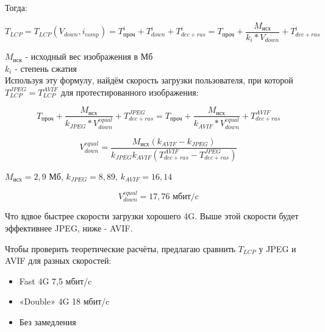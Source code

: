 \documentclass[12pt]{article}
\begin{document}
Тогда:

\[
    T_{LCP} = T_{LCP}(V_{down}, i_{comp}) = T^{i}_{\text{проч}} + T^{i}_{down} + T^{i}_{dec+ras} = T_{\text{проч}} + \frac{M_{\text{исх}}}{k_{i}*V_{down}} + T^{i}_{dec+ras}
\]

$M_{\text{иск}}$ - исходный вес изображения в Мб\\
$k_i$ - степень сжатия\\

Используя эту формулу, найдём скорость загрузки пользователя, при которой $T^{JPEG}_{LCP} = T^{AVIF}_{LCP}$ для протестированного изображения:

\[
    T_{\text{проч}} + \frac{M_{\text{исх}}}{k_{JPEG}*V^{equal}_{down}} + T^{JPEG}_{dec+ras} = T_{\text{проч}} + \frac{M_{\text{исх}}}{k_{AVIF}*V^{equal}_{down}} + T^{AVIF}_{dec+ras}
\]

\begin{equation}
    V^{equal}_{down} = \frac{M_{\text{исх}}(k_{AVIF}-k_{JPEG})}{k_{JPEG}k_{AVIF}(T^{AVIF}_{dec+ras} - T^{JPEG}_{dec+ras})}
\end{equation}

$M_{\text{исх}} = 2,9\text{ Мб}$, $k_{JPEG} = 8,89$, $k_{AVIF} = 16,14$

\[
    V^{equal}_{down} = 17,76 \text{ мбит/c}
\]

Что вдвое быстрее скорости загрузки хорошего 4G.
Выше этой скорости будет эффективнее JPEG, ниже - AVIF.

Чтобы проверить теоретические расчёты, предлагаю сравнить $T_{LCP}$ у JPEG
и AVIF для разных скоростей:

\begin{itemize}
    \item Fast 4G 7,5 мбит/c
    \item «Double» 4G 18 мбит/c
    \item Без замедления
\end{itemize}
\end{document}
